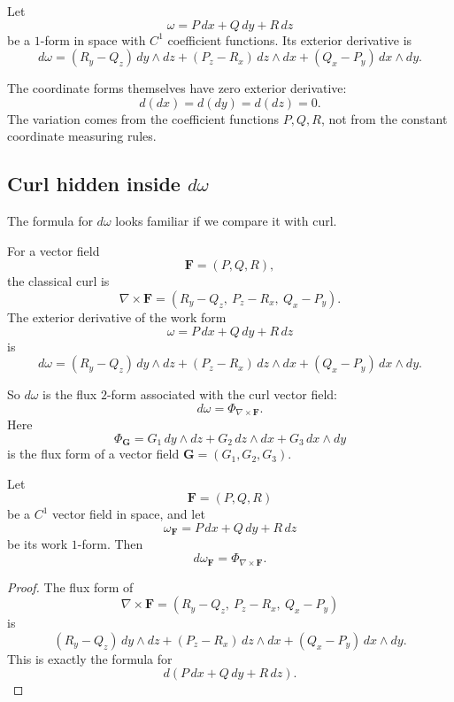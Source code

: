 \begin{definition}
Let
\[
    \omega=P\,dx+Q\,dy+R\,dz
\]
be a \(1\)-form in space with \(C^1\) coefficient functions.  Its exterior derivative is
\[
\boxed{
    d\omega
    =
    (R_y-Q_z)\,dy\wedge dz
    +
    (P_z-R_x)\,dz\wedge dx
    +
    (Q_x-P_y)\,dx\wedge dy.
}
\]
\end{definition}

The coordinate forms themselves have zero exterior derivative:
\[
    d(dx)=d(dy)=d(dz)=0.
\]
The variation comes from the coefficient functions \(P,Q,R\), not from the constant
coordinate measuring rules.

\subsection{Curl hidden inside \texorpdfstring{\(d\omega\)}{d omega}}

The formula for \(d\omega\) looks familiar if we compare it with curl.

For a vector field
\[
    \mathbf F=(P,Q,R),
\]
the classical curl is
\[
\boxed{
    \nabla\times\mathbf F
    =
    (R_y-Q_z,\ P_z-R_x,\ Q_x-P_y).
}
\]
The exterior derivative of the work form
\[
    \omega=P\,dx+Q\,dy+R\,dz
\]
is
\[
\boxed{
    d\omega
    =
    (R_y-Q_z)\,dy\wedge dz
    +
    (P_z-R_x)\,dz\wedge dx
    +
    (Q_x-P_y)\,dx\wedge dy.
}
\]

So \(d\omega\) is the flux \(2\)-form associated with the curl vector field:
\[
\boxed{
    d\omega=\Phi_{\nabla\times\mathbf F}.
}
\]
Here
\[
    \Phi_{\mathbf G}
    =
    G_1\,dy\wedge dz+G_2\,dz\wedge dx+G_3\,dx\wedge dy
\]
is the flux form of a vector field \(\mathbf G=(G_1,G_2,G_3)\).

\begin{theorem}
Let
\[
    \mathbf F=(P,Q,R)
\]
be a \(C^1\) vector field in space, and let
\[
    \omega_{\mathbf F}=P\,dx+Q\,dy+R\,dz
\]
be its work \(1\)-form.  Then
\[
\boxed{
    d\omega_{\mathbf F}=\Phi_{\nabla\times\mathbf F}.
}
\]
\end{theorem}

\begin{proof}
The flux form of
\[
    \nabla\times\mathbf F
    =
    (R_y-Q_z,\ P_z-R_x,\ Q_x-P_y)
\]
is
\[
    (R_y-Q_z)\,dy\wedge dz
    +
    (P_z-R_x)\,dz\wedge dx
    +
    (Q_x-P_y)\,dx\wedge dy.
\]
This is exactly the formula for
\[
    d(P\,dx+Q\,dy+R\,dz).
\]
\end{proof}

